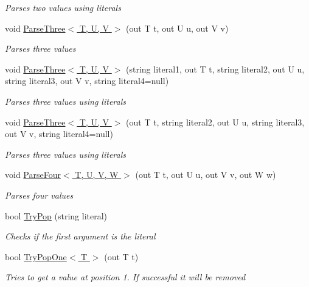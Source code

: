 \begin{DoxyCompactItemize}
\begin{DoxyCompactList}\small\item\em Parses two values using literals \end{DoxyCompactList}\item 
void \hyperlink{class_o_t_a_1_1_command_1_1_argument_list_a6c9dcde4a918a2b2abfda45d285177fa}{Parse\+Three$<$ T, U, V $>$} (out T t, out U u, out V v)
\begin{DoxyCompactList}\small\item\em Parses three values \end{DoxyCompactList}\item 
void \hyperlink{class_o_t_a_1_1_command_1_1_argument_list_acfe137a79414446deb18d601fba243f6}{Parse\+Three$<$ T, U, V $>$} (string literal1, out T t, string literal2, out U u, string literal3, out V v, string literal4=null)
\begin{DoxyCompactList}\small\item\em Parses three values using literals \end{DoxyCompactList}\item 
void \hyperlink{class_o_t_a_1_1_command_1_1_argument_list_a5d8a3790e1ac909a26952426ddec4501}{Parse\+Three$<$ T, U, V $>$} (out T t, string literal2, out U u, string literal3, out V v, string literal4=null)
\begin{DoxyCompactList}\small\item\em Parses three values using literals \end{DoxyCompactList}\item 
void \hyperlink{class_o_t_a_1_1_command_1_1_argument_list_af1b8429c9df3b1996489e449bb2ef213}{Parse\+Four$<$ T, U, V, W $>$} (out T t, out U u, out V v, out W w)
\begin{DoxyCompactList}\small\item\em Parses four values \end{DoxyCompactList}\item 
bool \hyperlink{class_o_t_a_1_1_command_1_1_argument_list_adf1629341cc13b118bf4aa4ec2279344}{Try\+Pop} (string literal)
\begin{DoxyCompactList}\small\item\em Checks if the first argument is the literal \end{DoxyCompactList}\item 
bool \hyperlink{class_o_t_a_1_1_command_1_1_argument_list_a677cd84f1c6b7048728d0d15a92d9b02}{Try\+Pop\+One$<$ T $>$} (out T t)
\begin{DoxyCompactList}\small\item\em Tries to get a value at position 1. If successful it will be removed \end{DoxyCompactList}\item 

\end{DoxyCompactItemize}
